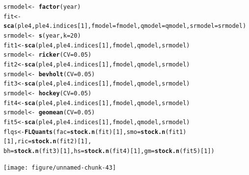 \documentclass[a4paper,english,10pt]{article}\usepackage[]{graphicx}\usepackage[]{color}
\makeatletter
\newcommand{\hlnum}[1]{\textcolor[rgb]{0.686,0.059,0.569}{#1}}%
\newcommand{\hlopt}[1]{\textcolor[rgb]{0,0,0}{#1}}%
\newcommand{\hlstd}[1]{\textcolor[rgb]{0.345,0.345,0.345}{#1}}%
\newcommand{\hlkwb}[1]{\textcolor[rgb]{0.69,0.353,0.396}{#1}}%
\newcommand{\hlkwc}[1]{\textcolor[rgb]{0.333,0.667,0.333}{#1}}%
\newcommand{\hlkwd}[1]{\textcolor[rgb]{0.737,0.353,0.396}{\textbf{#1}}}%
\newenvironment{kframe}{%
 \def\at@end@of@kframe{}%
 \ifinner\ifhmode%
  \def\at@end@of@kframe{\end{minipage}}%
  \begin{minipage}{\columnwidth}%
 \fi\fi%
 \def\FrameCommand##1{\hskip\@totalleftmargin \hskip-\fboxsep
 \colorbox{shadecolor}{##1}\hskip-\fboxsep
     \hskip-\linewidth \hskip-\@totalleftmargin \hskip\columnwidth}%
 \MakeFramed {\advance\hsize-\width
   \@totalleftmargin\z@ \linewidth\hsize
   \@setminipage}}%
 {\par\unskip\endMakeFramed%
 \at@end@of@kframe}
\newenvironment{knitrout}{}{} %
\makeatother
\begin{document}
\begin{knitrout}
\color{fgcolor}\begin{kframe}
\begin{alltt}
\hlstd{srmodel} \hlkwb{<-} \hlopt{~}\hlkwd{factor}\hlstd{(year)}
\hlstd{fit} \hlkwb{<-} \hlkwd{sca}\hlstd{(ple4, ple4.indices[}\hlnum{1}\hlstd{],} \hlkwc{fmodel} \hlstd{= fmodel,} \hlkwc{qmodel} \hlstd{= qmodel,} \hlkwc{srmodel} \hlstd{= srmodel)}
\hlstd{srmodel} \hlkwb{<-} \hlopt{~}\hlkwd{s}\hlstd{(year,} \hlkwc{k} \hlstd{=} \hlnum{20}\hlstd{)}
\hlstd{fit1} \hlkwb{<-} \hlkwd{sca}\hlstd{(ple4, ple4.indices[}\hlnum{1}\hlstd{], fmodel, qmodel, srmodel)}
\hlstd{srmodel} \hlkwb{<-} \hlopt{~}\hlkwd{ricker}\hlstd{(}\hlkwc{CV} \hlstd{=} \hlnum{0.05}\hlstd{)}
\hlstd{fit2} \hlkwb{<-} \hlkwd{sca}\hlstd{(ple4, ple4.indices[}\hlnum{1}\hlstd{], fmodel, qmodel, srmodel)}
\hlstd{srmodel} \hlkwb{<-} \hlopt{~}\hlkwd{bevholt}\hlstd{(}\hlkwc{CV} \hlstd{=} \hlnum{0.05}\hlstd{)}
\hlstd{fit3} \hlkwb{<-} \hlkwd{sca}\hlstd{(ple4, ple4.indices[}\hlnum{1}\hlstd{], fmodel, qmodel, srmodel)}
\hlstd{srmodel} \hlkwb{<-} \hlopt{~}\hlkwd{hockey}\hlstd{(}\hlkwc{CV} \hlstd{=} \hlnum{0.05}\hlstd{)}
\hlstd{fit4} \hlkwb{<-} \hlkwd{sca}\hlstd{(ple4, ple4.indices[}\hlnum{1}\hlstd{], fmodel, qmodel, srmodel)}
\hlstd{srmodel} \hlkwb{<-} \hlopt{~}\hlkwd{geomean}\hlstd{(}\hlkwc{CV} \hlstd{=} \hlnum{0.05}\hlstd{)}
\hlstd{fit5} \hlkwb{<-} \hlkwd{sca}\hlstd{(ple4, ple4.indices[}\hlnum{1}\hlstd{], fmodel, qmodel, srmodel)}
\hlstd{flqs} \hlkwb{<-} \hlkwd{FLQuants}\hlstd{(}\hlkwc{fac} \hlstd{=} \hlkwd{stock.n}\hlstd{(fit)[}\hlnum{1}\hlstd{],} \hlkwc{smo} \hlstd{=} \hlkwd{stock.n}\hlstd{(fit1)[}\hlnum{1}\hlstd{],} \hlkwc{ric} \hlstd{=} \hlkwd{stock.n}\hlstd{(fit2)[}\hlnum{1}\hlstd{],}
    \hlkwc{bh} \hlstd{=} \hlkwd{stock.n}\hlstd{(fit3)[}\hlnum{1}\hlstd{],} \hlkwc{hs} \hlstd{=} \hlkwd{stock.n}\hlstd{(fit4)[}\hlnum{1}\hlstd{],} \hlkwc{gm} \hlstd{=} \hlkwd{stock.n}\hlstd{(fit5)[}\hlnum{1}\hlstd{])}
\end{alltt}
\end{kframe}
\end{knitrout}


\begin{knitrout}
\color{fgcolor}

{\centering \texttt{[image: figure/unnamed-chunk-43]} 

}



\end{knitrout}
\end{document}
